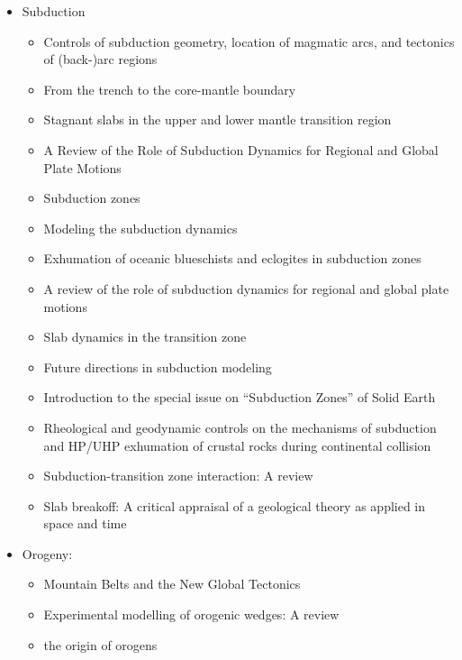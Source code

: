 \begin{itemize}

\item Subduction
   \begin{itemize}
   \item [\nineteeneightytwo] Controls of subduction geometry, location of magmatic arcs, 
         and tectonics of (back-)arc regions \cite{crpi82}
   \item [\nineteenninetyfive] From the trench to the core-mantle boundary \cite{kinc95}
   \item [\twothousandone] Stagnant slabs in the upper and lower mantle transition region \cite{fuwo01}
   \item [\twothousandone] A Review of the Role of Subduction Dynamics for Regional and Global Plate Motions \cite{befa09}
   \item [\twothousandtwo] Subduction zones \cite{ster02}
   \item [\twothousandeight] Modeling the subduction dynamics \cite{bill08}
   \item [\twothousandnine] Exhumation of oceanic blueschists and eclogites in subduction zones \cite{agyj09}
   \item [\twothousandnine] A review of the role of subduction dynamics for regional and global plate motions \cite{befa09}
   \item [\twothousandten] Slab dynamics in the transition zone \cite{bill10}
   \item [\twothousandeleven] Future directions in subduction modeling \cite{gery11}
   \item [\twothousandthirteen] Introduction to the special issue on “Subduction Zones” of Solid Earth \cite{bufv13}
   \item [\twothousandfourteen] Rheological and geodynamic controls on the mechanisms of subduction and HP/UHP exhumation 
                of crustal rocks during continental collision \cite{bufa14,bufy14b}
   \item [\twothousandseventeen] Subduction-transition zone interaction: A review \cite{goav17}
   \item [\twothousandeighteen] Slab breakoff: A critical appraisal of a geological theory as applied in space and time \cite{garm18}
   \end{itemize}

\item Orogeny:
   \begin{itemize}
   \item [\nineteenseventy] Mountain Belts and the New Global Tectonics  \cite{debi70}
   \item [\twothousandtwelve] Experimental modelling of orogenic wedges: A review \cite{grmd12} 
   \item [\twothousandthirteen] the origin of orogens \cite{jabe13}
   \end{itemize}


\end{itemize}
